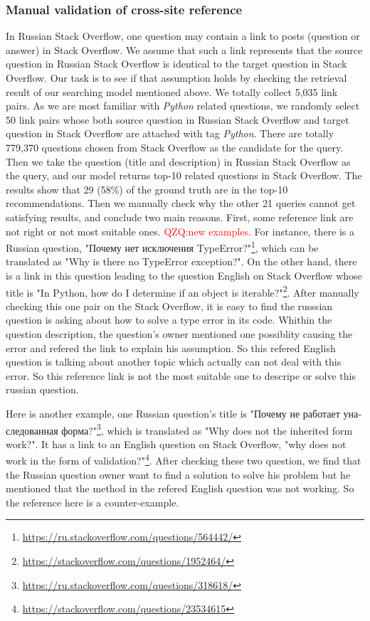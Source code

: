 \subsubsection{Manual validation of cross-site reference}
In Russian Stack Overflow, one question may contain a link to posts (question or answer) in Stack Overflow.
We assume that such a link represents that the source question in Russian Stack Overflow is identical to the target question in Stack Overflow.
Our task is to see if that assumption holds by checking the retrieval result of our searching model mentioned above.
We totally collect 5,035 link pairs.
As we are most familiar with \textit{Python} related questions, we randomly select 50 link pairs whose both source question in Russian Stack Overflow and target question in Stack Overflow are attached with tag \textit{Python}.
There are totally 779,370 questions chosen from Stack Overflow as the candidate for the query.
Then we take the question (title and description) in Russian Stack Overflow as the query, and our model returns top-10 related questions in Stack Overflow.
The results show that 29 (58\%) of the ground truth are in the top-10 recommendations.
Then we manually check why the other 21 queries cannot get satisfying results, and conclude two main reasons.
First, some reference link are not right or not most suitable ones.
\textcolor{red}{QZQ:new examples.} 
For instance, there is a Russian question, \foreignlanguage{russian}{"Почему нет исключения TypeError?"}\footnote{\url{https://ru.stackoverflow.com/questions/564442/}}, which can be translated as "Why is there no TypeError exception?".
On the other hand, there is a link in this question leading to the question English on Stack Overflow whose title is "In Python, how do I determine if an object is iterable?"\footnote{\url{https://stackoverflow.com/questions/1952464/}}. 
After manually checking this one pair on the Stack Overflow, it is easy to find the russsian question is asking about how to solve a type error in its code. Whithin the question description, the question's owner mentioned one possiblity causing the error and refered the link to explain his assumption. So this refered English question is talking about another topic which actually can not deal with this error. So this reference link is not the most suitable one to descripe or solve this russian question.

Here is another example, one Russian question's title is \foreignlanguage{russian}{"Почему не работает унаследованная форма?"}\footnote{\url{https://ru.stackoverflow.com/questions/318618/}}, which is translated as "Why does not the inherited form work?". 
It has a link to an English question on Stack Overflow, "why does not work in the form of validation?"\footnote{\url{https://stackoverflow.com/questions/23534615}}. 
After checking these two question, we find that the Russian question owner want to find a solution to solve his problem but he mentioned that the method in the refered English question was not working. So the reference here is a counter-example. 

